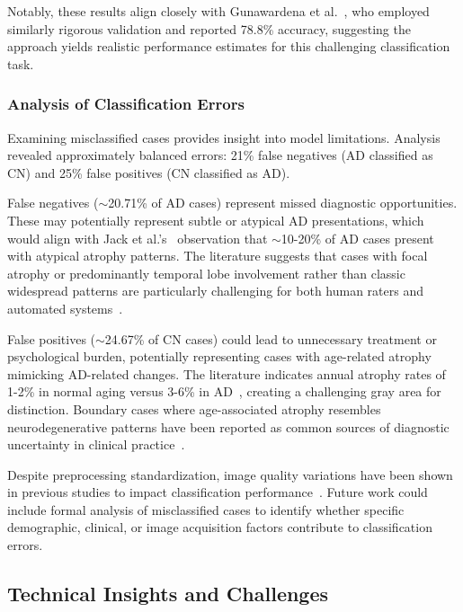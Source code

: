 \documentclass[11pt, a4paper]{article}
\begin{document}
Notably, these results align closely with Gunawardena et al.~\cite{gunawardena2017applying}, who employed similarly rigorous validation and reported 78.8\% accuracy, suggesting the approach yields realistic performance estimates for this challenging classification task.

\subsubsection{Analysis of Classification Errors}

Examining misclassified cases provides insight into model limitations. Analysis revealed approximately balanced errors: 21\% false negatives (AD classified as CN) and 25\% false positives (CN classified as AD).

False negatives ($\sim$20.71\% of AD cases) represent missed diagnostic opportunities. These may potentially represent subtle or atypical AD presentations, which would align with Jack et al.'s~\cite{jack2013tracking} observation that $\sim$10-20\% of AD cases present with atypical atrophy patterns. The literature suggests that cases with focal atrophy or predominantly temporal lobe involvement rather than classic widespread patterns are particularly challenging for both human raters and automated systems~\cite{kloppel2008accuracy}.

False positives ($\sim$24.67\% of CN cases) could lead to unnecessary treatment or psychological burden, potentially representing cases with age-related atrophy mimicking AD-related changes. The literature indicates annual atrophy rates of 1-2\% in normal aging versus 3-6\% in AD~\cite{vemuri2010role}, creating a challenging gray area for distinction. Boundary cases where age-associated atrophy resembles neurodegenerative patterns have been reported as common sources of diagnostic uncertainty in clinical practice~\cite{frisoni2010clinical}.

Despite preprocessing standardization, image quality variations have been shown in previous studies to impact classification performance~\cite{davatzikos2019machine}. Future work could include formal analysis of misclassified cases to identify whether specific demographic, clinical, or image acquisition factors contribute to classification errors.

\subsection{Technical Insights and Challenges}
\end{document}
